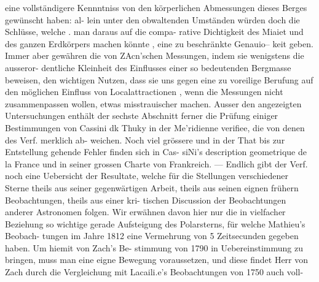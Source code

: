 \documentclass[12pt,a4paper]{article}
\begin{document}
eine vollständigere Kennntniss von den körperlichen Abmessungen dieses Berges gewünscht haben: al-\newline
lein unter den obwaltenden Umständen würden doch die Schlüsse, welche . man daraus auf die compa-\newline
rative Dichtigkeit des Miaiet und des ganzen Erdkörpers machen könnte , eine zu beschränkte Genauio--\newline
keit geben. Immer aber gewähren die von ZAcn'schen Messungen, indem sie wenigstens die ausseror-\newline
dentliche Kleinheit des Einflusses einer so bedeutenden Bergmasse beweisen, den wichtigen Nutzen, dass\newline
sie uns gegen eine zu voreilige Berufung auf den möglichen Einfluss von Localattractionen , wenn die\newline
Messungen nicht zusammenpassen wollen, etwas misstrauischer machen.\newline
Ausser den angezeigten Untersuchungen enthält der sechste Abschnitt ferner die Prüfung einiger\newline
Bestimmungen von Cassini dk Thuky in der Me'ridienne verifiee, die von denen des Verf. merklich ab-\newline
weichen. Noch viel grössere und in der That bis zur Entstellung gehende Fehler finden sich in Cas-\newline
siNi's description geometrique de la France und in seiner grossen Charte von Frankreich. --- Endlich\newline
gibt der Verf. noch eine Uebersicht der Resultate, welche für die Stellungen verschiedener Sterne theils\newline
aus seiner gegenwärtigen Arbeit, theils aus seinen eignen frühern Beobachtungen, theils aus einer kri-\newline
tischen Discussion der Beobachtungen anderer Astronomen folgen. Wir erwähnen davon hier nur die\newline
in vielfacher Beziehung so wichtige gerade Aufsteigung des Polarsterns, für welche Mathieu's Beobach-\newline
tungen im Jahre 1812 eine Vermehrung von 5 Zeitsecunden gegeben haben. Um hiemit von Zach's Be-\newline
stimmung von 1790 in Uebereinstimmung zu bringen, muss man eine eigne Bewegung voraussetzen, und\newline
diese findet Herr von Zach durch die Vergleichung mit Lacaili.e's Beobachtungen von 1750 auch voll-\newline
\end{document}

